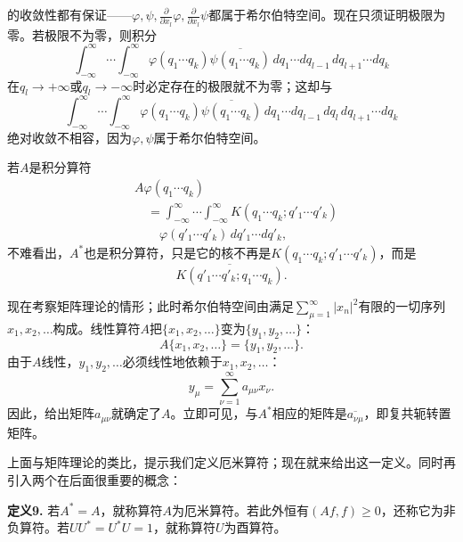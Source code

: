 \documentclass[fontsize=13pt,twoside,openany,headings=normal,parskip=false,bookmarkpackage=false,DIV=calc]{scrbook}
\begin{document}
的收敛性都有保证——$\varphi,\allowbreak \psi,\allowbreak \frac{\partial}{\partial x_l}\varphi,\allowbreak \frac{\partial}{\partial x_l}\psi$都属于希尔伯特空间。现在只须证明极限为零。若极限不为零，则积分
\[
\int_{-\infty}^{\infty}\cdots\int_{-\infty}^{\infty}\varphi(q_1\cdots q_k)\overline{\psi(q_1\cdots q_k)}\,dq_1\cdots dq_{l-1}\,dq_{l+1}\cdots dq_k
\]
在$q_l\to+\infty$或$q_l\to-\infty$时必定存在的极限就不为零；这却与
\[
\int_{-\infty}^{\infty}\cdots\int_{-\infty}^{\infty}\varphi(q_1\cdots q_k)\overline{\psi(q_1\cdots q_k)}\,dq_1\cdots dq_{l-1}\,dq_l\,dq_{l+1}\cdots dq_k
\]
绝对收敛不相容，因为$\varphi,\allowbreak \psi$属于希尔伯特空间。

\hypertarget{origpage-50}{}\label{origpage-50}若$A$是积分算符
\begin{align*}
&A\varphi(q_1\cdots q_k)\\
&\quad=\int_{-\infty}^{\infty}\cdots\int_{-\infty}^{\infty}K(q_1\cdots q_k;q'_1\cdots q'_k)\\
&\qquad\varphi(q'_1\cdots q'_k)\,dq'_1\cdots dq'_k,
\end{align*}
不难看出，$A^*$也是积分算符，只是它的核不再是$K(q_1\cdots q_k;q'_1\cdots q'_k)$，而是
\[
\overline{K(q'_1\cdots q'_k;q_1\cdots q_k)}.
\]

现在考察矩阵理论的情形；此时希尔伯特空间由满足$\sum_{\mu=1}^\infty|x_n|^2$有限的一切序列$x_1,\allowbreak x_2,\allowbreak \ldots$构成。线性算符$A$把$\{x_1,\allowbreak x_2,\allowbreak \ldots\}$变为$\{y_1,\allowbreak y_2,\allowbreak \ldots\}$：
\[
A\{x_1,x_2,\ldots\}=\{y_1,y_2,\ldots\}.
\]
由于$A$线性，$y_1,\allowbreak y_2,\allowbreak \ldots$必须线性地依赖于$x_1,\allowbreak x_2,\allowbreak \ldots$：
\[
y_\mu=\sum_{\nu=1}^\infty a_{\mu\nu}x_\nu.
\]
因此，给出矩阵$a_{\mu\nu}$就确定了$A$。立即可见，与$A^*$相应的矩阵是$\overline{a_{\nu\mu}}$，即复共轭转置矩阵。

上面与矩阵理论的类比，提示我们定义厄米算符；现在就来给出这一定义。同时再引入两个在后面很重要的概念：

\leavevmode{}\textbf{定义9.}\label{def:II.9} 若$A^*=A$，就称算符$A$为厄米算符。若此外恒有$(Af,\allowbreak f)\geq0$，还称它为非负算符。若$UU^*=U^*U=1$，就称算符$U$为酉算符。
\end{document}

